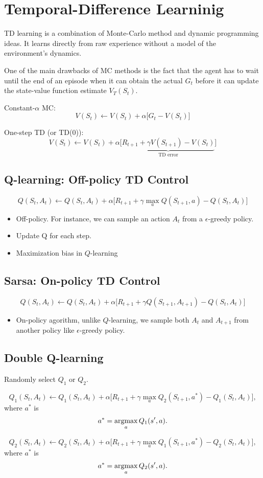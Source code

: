
\section{Temporal-Difference Learninig}

TD learning is a combination of Monte-Carlo method and dynamic programming ideas. It learns directly from raw experience without a model of the environment's dynamics. 

One of the main drawbacks of MC methods is the fact that the agent has to wait until the end of an episode when it can obtain the actual $G_t$ before it can update the state-value function estimate $V_T(S_t)$.


Constant-$\alpha$ MC:
$$V(S_t) \leftarrow V(S_t)+ \alpha \Big[G_t-V(S_t)\Big] $$

One-step TD (or TD(0)):
$$V(S_t) \leftarrow V(S_t)+ \alpha \Big[\underbrace{R_{t+1}+\gamma V(S_{t+1})-V(S_t)}_{\text{TD error}}\Big] $$


\subsection{Q-learning: Off-policy TD Control}

$$Q(S_t, A_t) \leftarrow Q(S_t, A_t)+ \alpha \Big[R_{t+1}+\gamma \max_a Q(S_{t+1}, a)-Q(S_t, A_t)\Big] $$

\begin{itemize}
	\item Off-policy. For instance, we can sample an action $A_t$ from a $\epsilon$-greedy policy. 
	\item Update Q for each step.
	\item Maximization bias in $Q$-learning
\end{itemize}

\subsection{Sarsa: On-policy TD Control}
$$Q(S_t, A_t) \leftarrow Q(S_t, A_t)+ \alpha \Big[R_{t+1}+\gamma Q(S_{t+1}, A_{t+1})-Q(S_t, A_t)\Big] $$
\begin{itemize}
	\item On-policy agorithm, unlike $Q$-learning, we sample both $A_t$ and $A_{t+1}$ from another policy like $\epsilon$-greedy policy. 
\end{itemize}


\subsection{Double Q-learning}

Randomly select $Q_1$ or $Q_2$.

$$Q_1(S_t, A_t) \leftarrow Q_1(S_t, A_t)+ \alpha \Big[R_{t+1}+\gamma \max_a Q_2(S_{t+1}, a^*)-Q_1(S_t, A_t)\Big], $$
where $a^*$ is 
$$a^* = \operatorname*{\operatorname{argmax}}_a Q_1(s',a).$$

$$Q_2(S_t, A_t) \leftarrow Q_2(S_t, A_t)+ \alpha \Big[R_{t+1}+\gamma \max_a Q_1(S_{t+1}, a^*)-Q_2(S_t, A_t)\Big], $$
where $a^*$ is 
$$a^* = \operatorname*{\operatorname{argmax}}_a Q_2(s',a).$$
